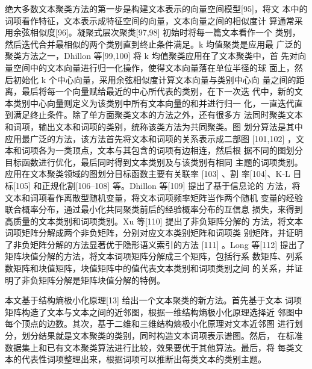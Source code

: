 \documentclass[a4paper]{apa6}
\begin{document}
绝大多数文本聚类方法的第一步是构建文本表示的向量空间模型[95]，将文 本中的词项看作特征，文本表示成特征空间的向量，文本向量之间的相似度计 算通常采用余弦相似度[96]。凝聚式层次聚类[97,98] 初始时将每一篇文本看作一个 类别，然后迭代合并最相似的两个类别直到终止条件满足。k 均值聚类是应用最 广泛的聚类方法之一，Dhillon 等[99,100] 将 k 均值聚类应用在了文本聚类中，首 先对向量空间中的文本向量进行归一化操作，使得文本向量落在单位半径的球 面上，然后初始化 k 个中心向量，采用余弦相似度计算文本向量与类别中心向 量之间的距离，最后将每一个向量赋给最近的中心所代表的类别，在下一次迭 代中，新的文本类别中心向量则定义为该类别中所有文本向量的和并进行归一 化，一直迭代直到满足终止条件。除了单方面聚类文本的方法之外，还有很多方 法同时聚类文本和词项，输出文本和词项的类别，统称该类方法为共同聚类。图 划分算法是其中应用最广泛的方法，该方法首先将文本和词项的关系表示成二部图 [101,102] ，文本和词项各为一类顶点，文本与其包含的词项有边相连，然后根 据不同的图划分目标函数进行优化，最后同时得到文本类别及与该类别有相同 主题的词项类别。应用在文本聚类领域的图划分目标函数主要有关联率 [103] 、割 率[104]、K-L 目标[105] 和正规化割[106–108] 等。Dhillon 等[109] 提出了基于信息论的 方法，将文本和词项看作离散型随机变量，将文本词项频率矩阵当作两个随机 变量的经验联合概率分布，通过最小化共同聚类前后的经验概率分布的互信息 损失，来得到高质量的文本类别和词项类别。Xu 等[110] 提出了非负矩阵分解的 方法，将文本词项矩阵分解成两个非负矩阵，分别对应文本类别矩阵和词项类 别矩阵，并证明了非负矩阵分解的方法显著优于隐形语义索引的方法 [111] 。Long 等[112] 提出了矩阵块值分解的方法，将文本词项矩阵分解成三个矩阵，包括行系 数矩阵、列系数矩阵和块值矩阵，块值矩阵中的值代表文本类别和词项类别之间 的关系，并证明了非负矩阵分解是矩阵块值分解的特例。

本文基于结构熵极小化原理[13] 给出一个文本聚类的新方法。首先基于文本 词项矩阵构造了文本与文本之间的近邻图，根据一维结构熵极小化原理选择近 邻图中每个顶点的边数。其次，基于二维和三维结构熵极小化原理对文本近邻图 进行划分，划分结果就是文本聚类的类别，同时构造文本词项表示谱图。然后， 在标准数据集上和已有文本聚类算法进行比较，效果要优于其他算法。最后，将 每类文本的代表性词项整理出来，根据词项可以推断出每类文本的类别主题。
\end{document}
